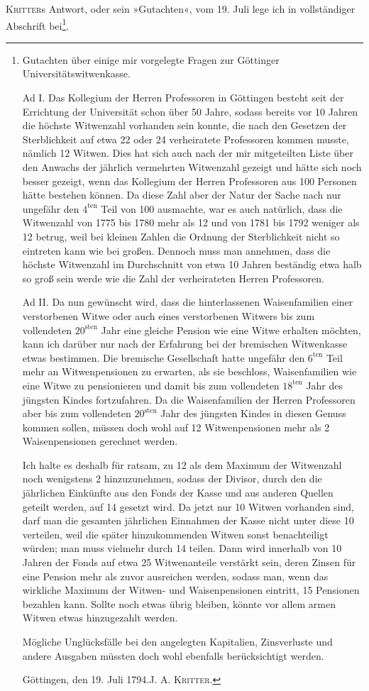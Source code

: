 \textsc{Kritter}s Antwort, oder sein »Gutachten«, vom 19. Juli lege ich in vollständiger Abschrift bei\footnote{Gutachten über einige mir vorgelegte Fragen zur Göttinger Universitätswitwenkasse.

Ad I. Das Kollegium der Herren Professoren in Göttingen besteht seit der Errichtung der Universität schon über 50 Jahre, sodass bereits vor 10 Jahren die höchste Witwenzahl vorhanden sein konnte, die nach den Gesetzen der Sterblichkeit auf etwa 22 oder 24 verheiratete Professoren kommen musste, nämlich 12 Witwen. Dies hat sich auch nach der mir mitgeteilten Liste über den Anwachs der jährlich vermehrten Witwenzahl gezeigt und hätte sich noch besser gezeigt, wenn das Kollegium der Herren Professoren aus 100 Personen hätte bestehen können. Da diese Zahl aber der Natur der Sache nach nur ungefähr den \(4^{\text{ten}}\) Teil von 100 ausmachte, war es auch natürlich, dass die Witwenzahl von 1775 bis 1780 mehr als 12 und von 1781 bis 1792 weniger als 12 betrug, weil bei kleinen Zahlen die Ordnung der Sterblichkeit nicht so eintreten kann wie bei großen. Dennoch muss man annehmen, dass die höchste Witwenzahl im Durchschnitt von etwa 10 Jahren beständig etwa halb so groß sein werde wie die Zahl der verheirateten Herren Professoren.

Ad II. Da nun gewünscht wird, dass die hinterlassenen Waisenfamilien einer verstorbenen Witwe oder auch eines verstorbenen Witwers bis zum vollendeten \(20^{\text{sten}}\) Jahr eine gleiche Pension wie eine Witwe erhalten möchten, kann ich darüber nur nach der Erfahrung bei der bremischen Witwenkasse etwas bestimmen. Die bremische Gesellschaft hatte ungefähr den \(6^{\text{ten}}\) Teil mehr an Witwenpensionen zu erwarten, als sie beschloss, Waisenfamilien wie eine Witwe zu pensionieren und damit bis zum vollendeten \(18^{\text{ten}}\) Jahr des jüngsten Kindes fortzufahren. Da die Waisenfamilien der Herren Professoren aber bis zum vollendeten \(20^{\text{sten}}\) Jahr des jüngsten Kindes in diesen Genuss kommen sollen, müssen doch wohl auf 12 Witwenpensionen mehr als 2 Waisenpensionen gerechnet werden.

Ich halte es deshalb für ratsam, zu 12 als dem Maximum der Witwenzahl noch wenigstens 2 hinzuzunehmen, sodass der Divisor, durch den die jährlichen Einkünfte aus den Fonds der Kasse und aus anderen Quellen geteilt werden, auf 14 gesetzt wird. Da jetzt nur 10 Witwen vorhanden sind, darf man die gesamten jährlichen Einnahmen der Kasse nicht unter diese 10 verteilen, weil die später hinzukommenden Witwen sonst benachteiligt würden; man muss vielmehr durch 14 teilen. Dann wird innerhalb von 10 Jahren der Fonds auf etwa 25 Witwenanteile verstärkt sein, deren Zinsen für eine Pension mehr als zuvor ausreichen werden, sodass man, wenn das wirkliche Maximum der Witwen- und Waisenpensionen eintritt, 15 Pensionen bezahlen kann. Sollte noch etwas übrig bleiben, könnte vor allem armen Witwen etwas hinzugezahlt werden.

Mögliche Unglücksfälle bei den angelegten Kapitalien, Zinsverluste und andere Ausgaben müssten doch wohl ebenfalls berücksichtigt werden.

Göttingen, den 19. Juli 1794.\hfill J. A. \textsc{Kritter}.}.

